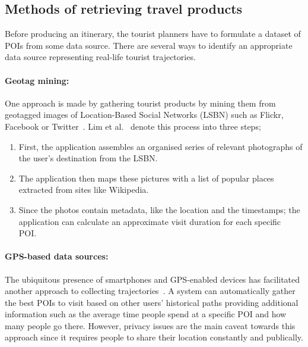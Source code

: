 \subsection{Methods of retrieving travel products}

Before producing an itinerary, the tourist planners have to
formulate a dataset of POIs from some data source. There are
several ways to identify an appropriate data source representing
real-life tourist trajectories.

\paragraph{Geotag mining:} One approach is made by gathering tourist products by mining them from
geotagged images of Location-Based Social Networks (LSBN) such as Flickr,
Facebook or Twitter~\cite{DeChoudhury2010, Memon2015, Lucchese2012, Lim2018a,
HuiLim, HuiLima, Kurashima2013, Kurashima2010, Brilhante2013, Brilhante2015 }.
Lim et al.~\cite{Lim2018} denote this process into three steps; 


\begin{enumerate}

\item First, the application assembles an organised series of relevant
    photographs of the user's destination from the LSBN.\@

\item The application then maps these pictures with a list of popular places
    extracted from sites like Wikipedia.

\item Since the photos contain metadata, like the location and the timestamps;
    the application can calculate an approximate visit duration for each
    specific POI.\

\end{enumerate}

\paragraph{GPS-based data sources:}
The ubiquitous presence of smartphones and
GPS-enabled devices has facilitated
another approach to collecting trajectories~\cite{10.1145/1889681.1889683,
10.1145/1526709.1526816, Chen2011a}. A system
can automatically gather the best POIs to visit based on other users'
historical paths providing additional information such as the average time
people spend at a specific POI and how many people go there. However, privacy
issues are the main caveat towards this approach since it requires people to
share their location constantly and publically\cite{Lim2018}.

